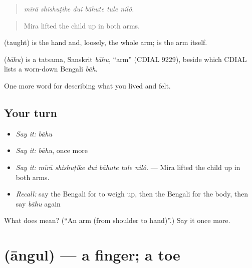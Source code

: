 \begin{quote}
     
\end{quote}

\begin{quote}
\emph{mīrā shishuṭike dui bāhute tule nilô.}
\end{quote}

\begin{quote}
Mira lifted the child up in both arms.
\end{quote}

 (taught) is the hand and, loosely, the whole arm;  is the arm itself.

\begin{cousinweb}
\textbf{} (\emph{bāhu}) is a tatsama, Sanskrit \emph{bāhu}, \textquotedblleft{}arm\textquotedblright{} (CDIAL 9229), beside which CDIAL lists a worn-down Bengali \emph{bāh}.
\end{cousinweb}

\begin{grammarlens}[title={What you've built}]
One more word for describing what you lived and felt.
\end{grammarlens}

\subsection*{Your turn}
\begin{itemize}
\raggedright
  \item \emph{Say it:} \emph{bāhu}
  \item \emph{Say it:} \emph{bāhu}, once more
  \item \emph{Say it:} \emph{mīrā shishuṭike dui bāhute tule nilô.} — Mira lifted the child up in both arms.
  \item \emph{Recall:} say the Bengali for to weigh up, then the Bengali for the body, then say \emph{bāhu} again
\end{itemize}

\begin{tcolorbox}[breakable,colback=teal!4,colframe=teal!35!black,title={Before you move on}]
What does  mean? (\textquotedblleft{}An arm (from shoulder to hand)\textquotedblright{}.) Say it once more.
\end{tcolorbox}
\section[\texorpdfstring{\bn{আঙুল} (āngul)}{আঙুল (āngul)}]{ (āngul) — a finger; a toe}

